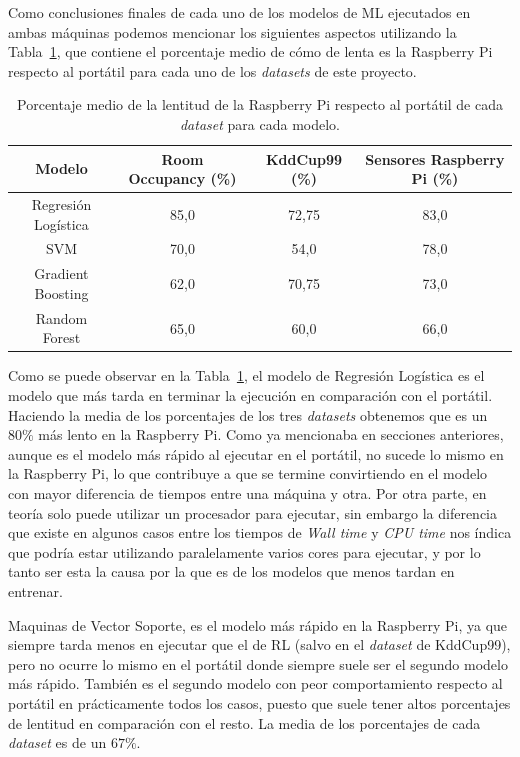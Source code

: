 \documentclass[a4paper, 12pt]{book}
\begin{document}
Como conclusiones finales de cada uno de los modelos de ML ejecutados en ambas máquinas podemos mencionar los siguientes aspectos utilizando la Tabla~\ref{tab:mean_per}, que contiene el porcentaje medio de cómo de lenta es la Raspberry Pi respecto al portátil para cada uno de los \textit{datasets} de este proyecto.

\begin{table}[htb]
\renewcommand{\arraystretch}{1.5}
\begin{adjustbox}{width=\textwidth}
\centering
    \begin{tabular}{c  c  c  c}
    \toprule
    Modelo & Room Occupancy (\%) & KddCup99 (\%) & Sensores Raspberry Pi (\%)\\
    \midrule
     Regresión Logística & 85,0 & 72,75 & 83,0\\
     SVM & 70,0 & 54,0 & 78,0\\
     Gradient Boosting & 62,0 & 70,75 & 73,0\\
     Random Forest & 65,0 & 60,0 & 66,0\\
    \bottomrule
    \end{tabular}
\end{adjustbox}
\caption{Porcentaje medio de la lentitud de la Raspberry Pi respecto al portátil de cada \textit{dataset} para cada modelo.}
\label{tab:mean_per}
\end{table}

Como se puede observar en la Tabla~\ref{tab:mean_per}, el modelo de Regresión Logística es el modelo que más tarda en terminar la ejecución en comparación con el portátil. Haciendo la media de los porcentajes de los tres \textit{datasets} obtenemos que es un $80\%$ más lento en la Raspberry Pi. Como ya mencionaba en secciones anteriores, aunque es el modelo más rápido al ejecutar en el portátil, no sucede lo mismo en la Raspberry Pi, lo que contribuye a que se termine convirtiendo en el modelo con mayor diferencia de tiempos entre una máquina y otra. Por otra parte, en teoría solo puede utilizar un procesador para ejecutar, sin embargo la diferencia que existe en algunos casos entre los tiempos de \textit{Wall time} y \textit{CPU time} nos índica que podría estar utilizando paralelamente varios cores para ejecutar, y por lo tanto ser esta la causa por la que es de los modelos que menos tardan en entrenar.

Maquinas de Vector Soporte, es el modelo más rápido en la Raspberry Pi, ya que siempre tarda menos en ejecutar que el de RL (salvo en el \textit{dataset} de KddCup99), pero no ocurre lo mismo en el portátil donde siempre suele ser el segundo modelo más rápido. También es el segundo modelo con peor comportamiento respecto al portátil en prácticamente todos los casos, puesto que suele tener altos porcentajes de lentitud en comparación con el resto. La media de los porcentajes de cada \textit{dataset} es de un $67\%$.
\end{document}
